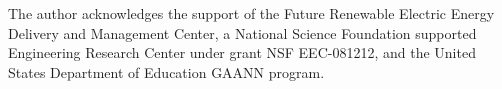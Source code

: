 The author acknowledges the support of the Future Renewable
Electric Energy Delivery and Management Center,
a National Science Foundation supported Engineering Research
Center under grant NSF EEC-081212, and the United States Department of Education GAANN program.
